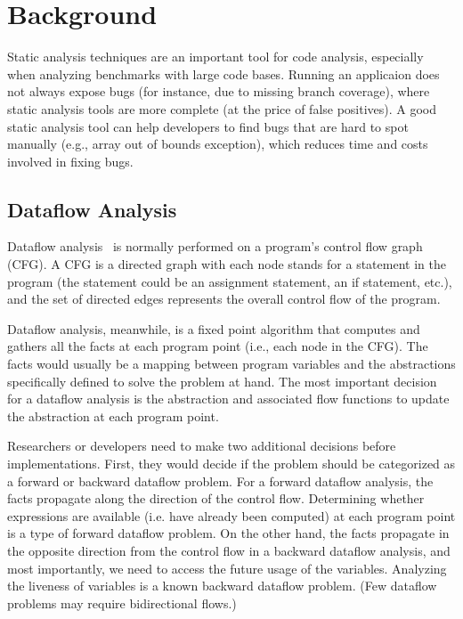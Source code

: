 \chapter{Background}
\label{chap:background}

Static analysis techniques are an important tool for code analysis, especially when analyzing benchmarks with large code bases. Running an applicaion does not always expose bugs (for instance, due to missing branch coverage), where static analysis tools are more complete (at the price of false positives). A good static analysis tool can help developers to find bugs that are hard to spot manually (e.g., array out of bounds exception), which reduces time and costs involved in fixing bugs. 

\section{Dataflow Analysis}

Dataflow analysis~\cite{kildall73:_unified_approac_global_progr_optim} is normally performed on a program's control flow graph (CFG). A CFG is a directed graph with each node stands for a statement in the program (the statement could be an assignment statement, an if statement, etc.), and the set of directed edges represents the overall control flow of the program.

Dataflow analysis, meanwhile, is a fixed point algorithm that computes and gathers all the facts at each program point (i.e., each node in the CFG). The facts would usually be a mapping between program variables and the abstractions specifically defined to solve the problem at hand. The most important decision for a dataflow analysis is the abstraction and associated flow functions to update the abstraction at each program point.

Researchers or developers need to make two additional decisions before implementations. First, they would decide if the problem should be categorized as a forward or backward dataflow problem. For a forward dataflow analysis, the facts propagate along the direction of the control flow. Determining whether expressions are available (i.e. have already been computed) at each program point is a type of forward dataflow problem. On the other hand, the facts propagate in the opposite direction from the control flow in a backward dataflow analysis, and most importantly, we need to access the future usage of the variables. Analyzing the liveness of variables is a known backward dataflow problem. (Few dataflow problems may require bidirectional flows.)

